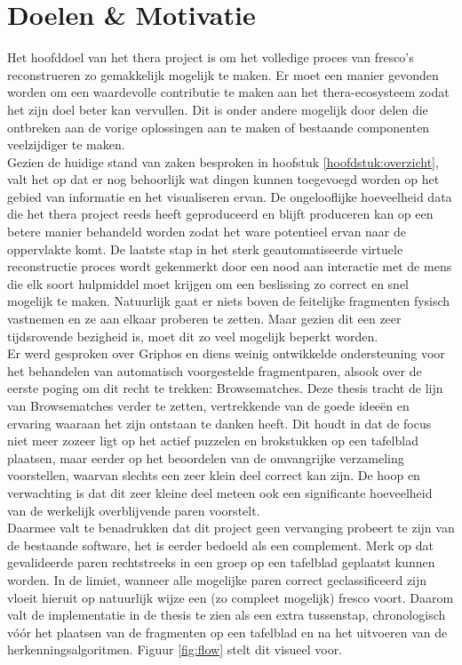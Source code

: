 \chapter{Doelen \& Motivatie}
\label{hoofdstuk:doelen}

Het hoofddoel van het thera project is om het volledige proces van fresco's reconstrueren zo gemakkelijk mogelijk te maken. Er moet een manier gevonden worden om een waardevolle contributie te maken aan het thera-ecosysteem zodat het zijn doel beter kan vervullen. Dit is onder andere mogelijk door delen die ontbreken aan de vorige oplossingen aan te maken of bestaande componenten veelzijdiger te maken.\\

Gezien de huidige stand van zaken besproken in hoofstuk \ref{hoofdstuk:overzicht}, valt het op dat er nog behoorlijk wat dingen kunnen toegevoegd worden op het gebied van informatie en het visualiseren ervan. De ongelooflijke hoeveelheid data die het thera project reeds heeft geproduceerd en blijft produceren kan op een betere manier behandeld worden zodat het ware potentieel ervan naar de oppervlakte komt. De laatste stap in het sterk geautomatiseerde virtuele reconstructie proces wordt gekenmerkt door een nood aan interactie met de mens die elk soort hulpmiddel moet krijgen om een beslissing zo correct en snel mogelijk te maken. Natuurlijk gaat er niets boven de feitelijke fragmenten fysisch vastnemen en ze aan elkaar proberen te zetten. Maar gezien dit een zeer tijdsrovende bezigheid is, moet dit zo veel mogelijk beperkt worden.\\

Er werd gesproken over Griphos en diens weinig ontwikkelde ondersteuning voor het behandelen van automatisch voorgestelde fragmentparen, alsook over de eerste poging om dit recht te trekken: Browsematches. Deze thesis tracht de lijn van Browsematches verder te zetten, vertrekkende van de goede idee\"en en ervaring waaraan het zijn ontstaan te danken heeft. Dit houdt in dat de focus niet meer zozeer ligt op het actief puzzelen en brokstukken op een tafelblad plaatsen, maar eerder op het beoordelen van de omvangrijke verzameling voorstellen, waarvan slechts een zeer klein deel correct kan zijn. De hoop en verwachting is dat dit zeer kleine deel meteen ook een significante hoeveelheid van de werkelijk overblijvende paren voorstelt.\\

Daarmee valt te benadrukken dat dit project geen vervanging probeert te zijn van de bestaande software, het is eerder bedoeld als een complement. Merk op dat gevalideerde paren rechtstreeks in een groep op een tafelblad geplaatst kunnen worden. In de limiet, wanneer alle mogelijke paren correct geclassificeerd zijn vloeit hieruit op natuurlijk wijze een (zo compleet mogelijk) fresco voort. Daarom valt de implementatie in de thesis te zien als een extra tussenstap, chronologisch v\'o\'or het plaatsen van de fragmenten op een tafelblad en na het uitvoeren van de herkenningsalgoritmen. Figuur \ref{fig:flow} stelt dit visueel voor.

